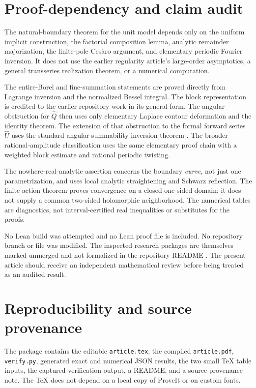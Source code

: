 \documentclass[11pt,a4paper]{article}
\numberwithin{equation}{section}
\theoremstyle{definition}
\theoremstyle{remark}
\newcommand{\U}{\widehat U}
\newcommand{\Q}{\widehat Q}
\begin{document}
\appendix
\section{Proof-dependency and claim audit}
\label{app:audit}

The natural-boundary theorem for the unit model depends only on the
uniform implicit construction, the factorial composition lemma, analytic
remainder majorization, the finite-pole Ces\`aro argument, and elementary
periodic Fourier inversion.  It does not use the earlier regularity
article's large-order asymptotics, a general transseries realization
theorem, or a numerical computation.

The entire-Borel and fine-summation statements are proved directly from
Lagrange inversion and the normalized Bessel integral.  The block
representation is credited to the earlier repository work in its general
form.  The angular obstruction for $\Q$ then uses only elementary
Laplace contour deformation and the identity theorem.  The extension of
that obstruction to the formal forward series $\U$ uses the standard
angular summability inversion theorem \cite{sauzin}.  The broader
rational-amplitude classification uses the same elementary proof chain
with a weighted block estimate and rational periodic twisting.

The nowhere-real-analytic assertion concerns the boundary \emph{curve},
not just one parametrization, and uses local analytic straightening and
Schwarz reflection.  The finite-action theorem proves convergence on a
closed one-sided domain; it does not supply a common two-sided
holomorphic neighborhood.  The numerical tables are diagnostics, not
interval-certified real inequalities or substitutes for the proofs.

No Lean build was attempted and no Lean proof file is included.  No
repository branch or file was modified.  The inspected research packages
are themselves marked unmerged and not formalized in the repository
README \cite{repo-index}.  The present article should receive an
independent mathematical review before being treated as an audited result.

\section{Reproducibility and source provenance}
\label{app:reproduce}

The package contains the editable \texttt{article.tex}, the compiled
\texttt{article.pdf}, \texttt{verify.py}, generated exact and numerical
JSON results, the two small TeX table inputs, the captured verification
output, a README, and a source-provenance note.
The TeX does not depend on a local copy of ProveIt or on custom fonts.
\end{document}
